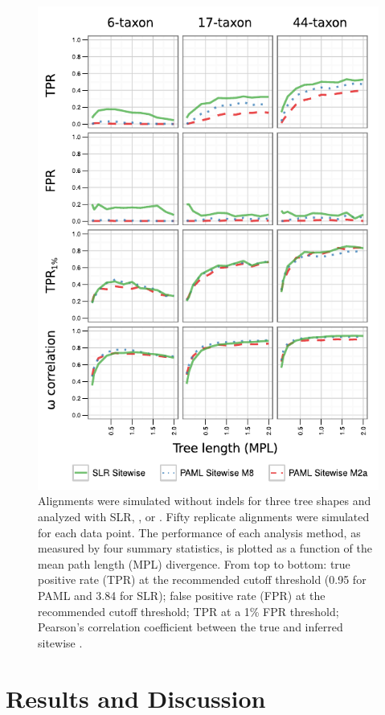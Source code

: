 \begin{figure}[t!]
\centering
\includegraphics[scale=1]{Figs/fig2.pdf}
\caption{Alignments were simulated without indels for three tree
  shapes and analyzed with SLR, \meight, or \mtwo. Fifty replicate
  alignments were simulated for each data point. The performance of
  each analysis method, as measured by four summary statistics, is
  plotted as a function of the mean path length (MPL) divergence. From
  top to bottom: true positive rate (TPR) at the recommended cutoff
  threshold (0.95 for PAML and 3.84 for SLR); false positive rate
  (FPR) at the recommended cutoff threshold; TPR at a 1\% FPR
  threshold; Pearson's correlation coefficient between the true and
  inferred sitewise \omg.}
\label{fig_2}
\end{figure}

\section{Results and Discussion}
